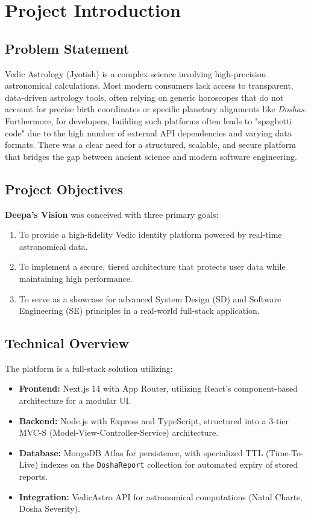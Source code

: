 \documentclass[12pt,a4paper]{article}
\begin{document}
\newpage
\tableofcontents
\newpage

\section{Project Introduction}

\subsection{Problem Statement}
Vedic Astrology (Jyotish) is a complex science involving high-precision astronomical calculations. Most modern consumers lack access to transparent, data-driven astrology tools, often relying on generic horoscopes that do not account for precise birth coordinates or specific planetary alignments like \textit{Doshas}. Furthermore, for developers, building such platforms often leads to "spaghetti code" due to the high number of external API dependencies and varying data formats. There was a clear need for a structured, scalable, and secure platform that bridges the gap between ancient science and modern software engineering.

\subsection{Project Objectives}
\textbf{Deepa's Vision} was conceived with three primary goals:
\begin{enumerate}
    \item To provide a high-fidelity Vedic identity platform powered by real-time astronomical data.
    \item To implement a secure, tiered architecture that protects user data while maintaining high performance.
    \item To serve as a showcase for advanced System Design (SD) and Software Engineering (SE) principles in a real-world full-stack application.
\end{enumerate}

\subsection{Technical Overview}
The platform is a full-stack solution utilizing:
\begin{itemize}
    \item \textbf{Frontend:} Next.js 14 with App Router, utilizing React's component-based architecture for a modular UI.
    \item \textbf{Backend:} Node.js with Express and TypeScript, structured into a 3-tier MVC-S (Model-View-Controller-Service) architecture.
    \item \textbf{Database:} MongoDB Atlas for persistence, with specialized TTL (Time-To-Live) indexes on the \texttt{DoshaReport} collection for automated expiry of stored reports.
    \item \textbf{Integration:} VedicAstro API for astronomical computations (Natal Charts, Dosha Severity).
\end{itemize}
\end{document}
